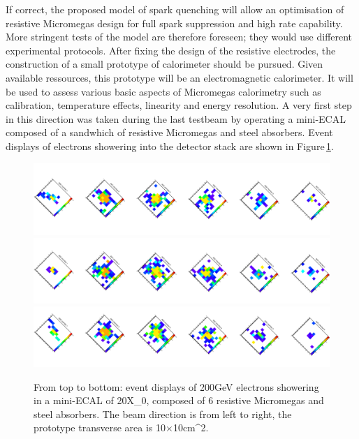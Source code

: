 \documentclass{article}
\begin{document}
If correct, the proposed model of spark quenching will allow an optimisation of resistive Micromegas design for full spark suppression and high rate capability. More stringent tests of the model are therefore foreseen; they would use different experimental protocols. After fixing the design of the resistive electrodes, the construction of a small prototype of calorimeter should be pursued. Given available ressources, this prototype will be an electromagnetic calorimeter. It will be used to assess various basic aspects of Micromegas calorimetry such as calibration, temperature effects, linearity and energy resolution. A very first step in this direction was taken during the last testbeam by operating a mini-ECAL composed of a sandwhich of resistive Micromegas and steel absorbers. Event displays of electrons showering into the detector stack are shown in Figure\,\ref{eventDisplay}.


\begin{figure}[h]
\centering
\includegraphics[width=0.95\linewidth]{evtdisplay1}
\includegraphics[width=0.95\linewidth]{evtdisplay2}
\includegraphics[width=0.95\linewidth]{evtdisplay3}
\caption{From top to bottom: event displays of \unit{200}{GeV} electrons showering in a mini-ECAL of \unit{20}{X_{0}}, composed of 6 resistive Micromegas and steel absorbers. The beam direction is from left to right, the prototype transverse area is 10$\times$\unit{10}{cm^{2}}.}
\label{eventDisplay}
\end{figure}
\end{document}
